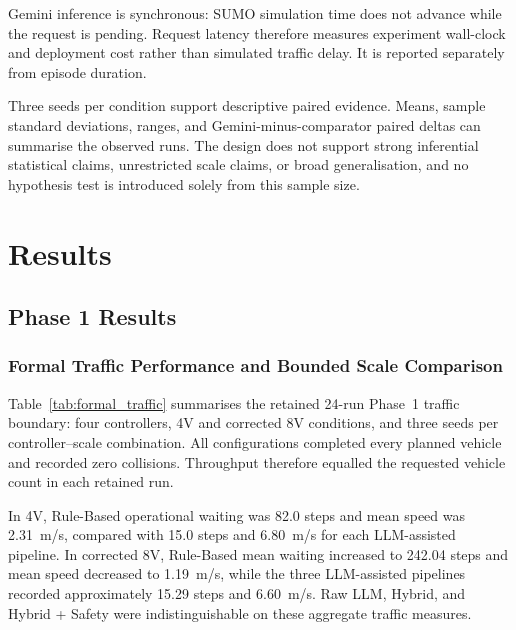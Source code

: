 \documentclass[letterpaper,10pt,conference]{ieeeconf}
\begin{document}
Gemini inference is synchronous: SUMO simulation time does not advance while the request is pending. Request latency therefore measures experiment wall-clock and deployment cost rather than simulated traffic delay. It is reported separately from episode duration.



Three seeds per condition support descriptive paired evidence. Means, sample standard deviations, ranges, and Gemini-minus-comparator paired deltas can summarise the observed runs. The design does not support strong inferential statistical claims, unrestricted scale claims, or broad generalisation, and no hypothesis test is introduced solely from this sample size.



\section{Results}



\subsection{Phase 1 Results}



\subsubsection{Formal Traffic Performance and Bounded Scale Comparison}



Table~\ref{tab:formal_traffic} summarises the retained 24-run Phase~1 traffic boundary: four controllers, 4V and corrected 8V conditions, and three seeds per controller--scale combination. All configurations completed every planned vehicle and recorded zero collisions. Throughput therefore equalled the requested vehicle count in each retained run.



In 4V, Rule-Based operational waiting was 82.0 steps and mean speed was 2.31~m/s, compared with 15.0 steps and 6.80~m/s for each LLM-assisted pipeline. In corrected 8V, Rule-Based mean waiting increased to 242.04 steps and mean speed decreased to 1.19~m/s, while the three LLM-assisted pipelines recorded approximately 15.29 steps and 6.60~m/s. Raw LLM, Hybrid, and Hybrid + Safety were indistinguishable on these aggregate traffic measures.
\end{document}
